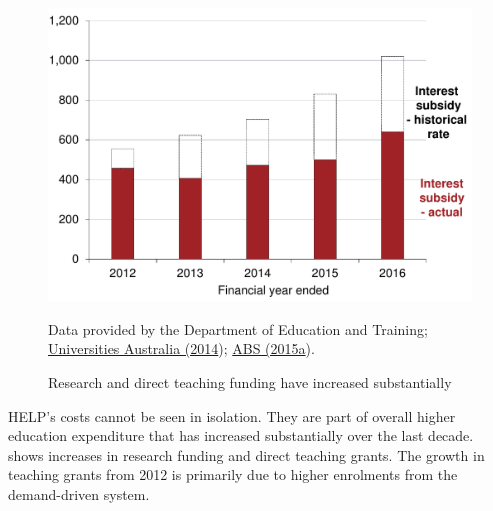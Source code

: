 \documentclass[embargoed]{grattan}
\begin{document}
{\begin{figure}
\caption{Research and direct teaching funding have increased substantially\label{fig:fig12-research-direct-teaching-funding-have-increased-substantially}}


\includegraphics[page=12]{atlas/Chartpack.pdf}

{Data provided by the Department of Education and Training; \protect\hyperlink{_ENREF_78}{Universities Australia (2014}); \protect\hyperlink{_ENREF_2}{ABS (2015a}).}
\end{figure}


\gls{HELP}'s costs cannot be seen in isolation.
They are part of overall higher education expenditure that has increased substantially over the last decade.
 shows increases in research funding and direct teaching grants.
The growth in teaching grants from 2012 is primarily due to higher enrolments from the demand-driven system.

}
\end{document}
